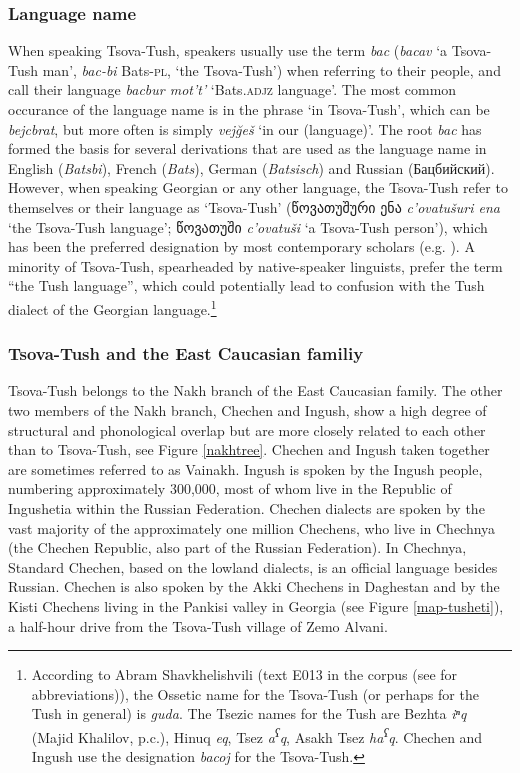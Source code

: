 \subsubsection{Language name}

When speaking Tsova-Tush, speakers usually use the term \textit{bac} (\textit{bacav} `a Tsova-Tush man', \textit{bac-bi} Bats-\textsc{pl}, `the Tsova-Tush') when referring to their people, and call their language \textit{bacbur mot't'} `Bats.\textsc{adjz} language'. The most common occurance of the language name is in the phrase `in Tsova-Tush', which can be \textit{bejcbrat}, but more often is simply \textit{vej\u{g}eš} `in our (language)'. The root \textit{bac} has formed the basis for several derivations that are used as the language name in English (\textit{Batsbi}), French (\textit{Bats}), German (\textit{Batsisch}) and Russian (Бацбийский). However, when speaking Georgian or any other language, the Tsova-Tush refer to themselves or their language as `Tsova-Tush' (\foreignlanguage{georgian}{წოვათუშური ენა} \textit{c'ovatušuri ena} `the Tsova-Tush language'; \foreignlanguage{georgian}{წოვათუში}  \textit{c'ovatuši} `a Tsova-Tush person'), which has been the preferred designation by most contemporary scholars (e.g. \cite{holiskygagua,hauk}). A minority of Tsova-Tush, spearheaded by native-speaker linguists, prefer the term ``the Tush language'', which could potentially lead to confusion with the Tush dialect of the Georgian language.\footnote{According to Abram Shavkhelishvili (text E013 in the corpus (see  for abbreviations)), the Ossetic name for the Tsova-Tush (or perhaps for the Tush in general) is \textit{guda}. The Tsezic names for the Tush are Bezhta \textit{iⁿq} (Majid Khalilov, p.c.), Hinuq \textit{eq}, Tsez \textit{a\textsuperscript{ʕ}q}, Asakh Tsez \textit{ha\textsuperscript{ʕ}q}. Chechen and Ingush use the designation \textit{bacoj} for the Tsova-Tush.}

\subsubsection{Tsova-Tush and the East Caucasian familiy}	
Tsova-Tush belongs to the Nakh branch of the East Caucasian family. The other two members of the Nakh branch, Chechen and Ingush, show a high degree of structural and phonological overlap but are more closely related to each other than to Tsova-Tush, see Figure \ref{nakhtree}. Chechen and Ingush taken together are sometimes referred to as Vainakh. Ingush is spoken by the Ingush people, numbering approximately 300,000, most of whom live in the Republic of Ingushetia within the Russian Federation. Chechen dialects are spoken by the vast majority of the approximately one million Chechens, who live in Chechnya (the Chechen Republic, also part of the Russian Federation). In Chechnya, Standard Chechen, based on the lowland dialects, is an official language besides Russian. Chechen is also spoken by the Akki Chechens in Daghestan and by the Kisti Chechens living in the Pankisi valley in Georgia (see Figure \ref{map-tusheti}), a half-hour drive from the Tsova-Tush village of Zemo Alvani.


